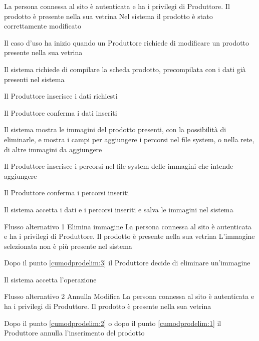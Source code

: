 {}
{La persona connessa al sito è autenticata e ha i privilegi di Produttore. Il prodotto è presente nella sua vetrina}%
{Nel sistema il prodotto è stato correttamente modificato}
{\begin{enumCU}
		\item Il caso d'uso ha inizio quando un Produttore richiede di modificare un prodotto presente nella sua vetrina
		\item Il sistema richiede di compilare la scheda prodotto, precompilata con i dati già presenti nel sistema
		\item Il Produttore inserisce i dati richiesti \label{cumodprodelim:1}
		\item Il Produttore conferma i dati inseriti
		\item Il sistema mostra le immagini del prodotto presenti, con la possibilità di eliminarle, e mostra i campi per aggiungere i percorsi nel file system, o nella rete, di altre immagini da aggiungere \label{cumodprodelim:3}
		\item Il Produttore inserisce i percorsi nel file system delle immagini che intende aggiungere
		\item Il Produttore conferma i percorsi inseriti \label{cumodprodelim:2}
		\item Il sistema accetta i dati e i percorsi inseriti e salva le immagini nel sistema
	\end{enumCU}} %
%
{Flusso alternativo 1}%
{Elimina immagine}%
{La persona connessa al sito è autenticata e ha i privilegi di Produttore. Il prodotto è presente nella sua vetrina}
{L'immagine selezionata non è più presente nel sistema}%
{\begin{enumCU}
		\item Dopo il punto \ref{cumodprodelim:3} il Produttore decide di eliminare un'immagine
		\item Il sistema accetta l'operazione
	\end{enumCU}}%
%
{Flusso alternativo 2}%
{Annulla Modifica}%
{La persona connessa al sito è autenticata e ha i privilegi di Produttore. Il prodotto è presente nella sua vetrina}%
{\postNulle}%
{\begin{enumCU}
		\item Dopo il punto \ref{cumodprodelim:2} o dopo il punto \ref{cumodprodelim:1} il Produttore annulla l'inserimento del prodotto
	\end{enumCU}}%

